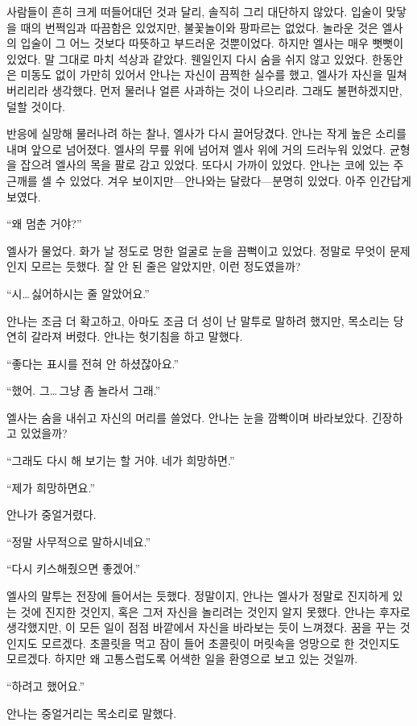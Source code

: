 사람들이 흔히 크게 떠들어대던 것과 달리, 솔직히 그리 대단하지 않았다. 입술이 맞닿을 때의 번쩍임과 따끔함은 있었지만, 불꽃놀이와 팡파르는 없었다. 놀라운 것은 엘사의 입술이 그 어느 것보다 따뜻하고 부드러운 것뿐이었다. 하지만 엘사는 매우 뻣뻣이 있었다. 말 그대로 마치 석상과 같았다. 웬일인지 다시 숨을 쉬지 않고 있었다. 한동안은 미동도 없이 가만히 있어서 안나는 자신이 끔찍한 실수를 했고, 엘사가 자신을 밀쳐버리리라 생각했다. 먼저 물러나 얼른 사과하는 것이 나으리라. 그래도 불편하겠지만, 덜할 것이다.

반응에 실망해 물러나려 하는 찰나, 엘사가 다시 끌어당겼다. 안나는 작게 높은 소리를 내며 앞으로 넘어졌다. 엘사의 무릎 위에 넘어져 엘사 위에 거의 드러누워 있었다. 균형을 잡으려 엘사의 목을 팔로 감고 있었다. 또다시 가까이 있었다. 안나는 코에 있는 주근깨를 셀 수 있었다. 겨우 보이지만—안나와는 달랐다—분명히 있었다. 아주 인간답게 보였다.

``왜 멈춘 거야?''

엘사가 물었다. 화가 날 정도로 멍한 얼굴로 눈을 끔뻑이고 있었다. 정말로 무엇이 문제인지 모르는 듯했다. 잘 안 된 줄은 알았지만, 이런 정도였을까?

``시\ldots\,싫어하시는 줄 알았어요.''

안나는 조금 더 확고하고, 아마도 조금 더 성이 난 말투로 말하려 했지만, 목소리는 당연히 갈라져 버렸다. 안나는 헛기침을 하고 말했다.

``좋다는 표시를 전혀 안 하셨잖아요.''

``했어. 그\ldots\,그냥 좀 놀라서 그래.''

엘사는 숨을 내쉬고 자신의 머리를 쓸었다. 안나는 눈을 깜빡이며 바라보았다. 긴장하고 있었을까?

``그래도 다시 해 보기는 할 거야. 네가 희망하면.''

``제가 희망하면요.''

안나가 중얼거렸다.

``정말 사무적으로 말하시네요.''

``다시 키스해줬으면 좋겠어.''

엘사의 말투는 전장에 들어서는 듯했다. 정말이지, 안나는 엘사가 정말로 진지하게 있는 것에 진지한 것인지, 혹은 그저 자신을 놀리려는 것인지 알지 못했다. 안나는 후자로 생각했지만, 이 모든 일이 점점 바깥에서 자신을 바라보는 듯이 느껴졌다. 꿈을 꾸는 것인지도 모르겠다. 초콜릿을 먹고 잠이 들어 초콜릿이 머릿속을 엉망으로 한 것인지도 모르겠다. 하지만 왜 고통스럽도록 어색한 일을 환영으로 보고 있는 것일까.

``하려고 했어요.''

안나는 중얼거리는 목소리로 말했다.

